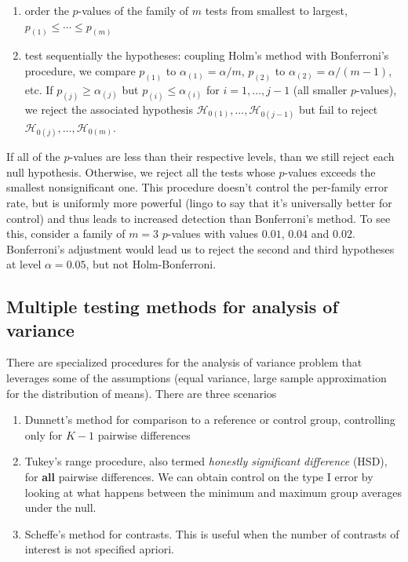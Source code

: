 \documentclass[
  11pt,
  letterpaper,
]{scrbook}
\providecommand{\tightlist}{%
  \setlength{\itemsep}{0pt}\setlength{\parskip}{0pt}}\usepackage{longtable,booktabs,array}
\theoremstyle{definition}
\theoremstyle{remark}
\begin{document}
\begin{enumerate}
\def\labelenumi{\arabic{enumi}.}
\tightlist
\item
  order the \(p\)-values of the family of \(m\) tests from smallest to
  largest, \(p_{(1)} \leq \cdots \leq p_{(m)}\)
\item
  test sequentially the hypotheses: coupling Holm's method with
  Bonferroni's procedure, we compare \(p_{(1)}\) to
  \(\alpha_{(1)} = \alpha/m\), \(p_{(2)}\) to
  \(\alpha_{(2)}=\alpha/(m-1)\), etc. If \(p_{(j)} \geq \alpha_{(j)}\)
  but \(p_{(i)} \leq \alpha_{(i)}\) for \(i=1, \ldots, j-1\) (all
  smaller \(p\)-values), we reject the associated hypothesis
  \(\mathscr{H}_{0(1)}, \ldots, \mathscr{H}_{0(j-1)}\) but fail to
  reject \(\mathscr{H}_{0(j)}, \ldots, \mathscr{H}_{0(m)}\).
\end{enumerate}

If all of the \(p\)-values are less than their respective levels, than
we still reject each null hypothesis. Otherwise, we reject all the tests
whose \(p\)-values exceeds the smallest nonsignificant one. This
procedure doesn't control the per-family error rate, but is uniformly
more powerful (lingo to say that it's universally better for control)
and thus leads to increased detection than Bonferroni's method. To see
this, consider a family of \(m=3\) \(p\)-values with values \(0.01\),
\(0.04\) and \(0.02\). Bonferroni's adjustment would lead us to reject
the second and third hypotheses at level \(\alpha=0.05\), but not
Holm-Bonferroni.

\hypertarget{multiple-testing-methods-for-analysis-of-variance}{%
\subsection{Multiple testing methods for analysis of
variance}\label{multiple-testing-methods-for-analysis-of-variance}}

There are specialized procedures for the analysis of variance problem
that leverages some of the assumptions (equal variance, large sample
approximation for the distribution of means). There are three scenarios

\begin{enumerate}
\def\labelenumi{\arabic{enumi}.}
\tightlist
\item
  Dunnett's method for comparison to a reference or control group,
  controlling only for \(K-1\) pairwise differences
\item
  Tukey's range procedure, also termed \emph{honestly significant
  difference} (HSD), for \textbf{all} pairwise differences. We can
  obtain control on the type I error by looking at what happens between
  the minimum and maximum group averages under the null.
\item
  Scheffe's method for contrasts. This is useful when the number of
  contrasts of interest is not specified apriori.
\end{enumerate}
\end{document}
